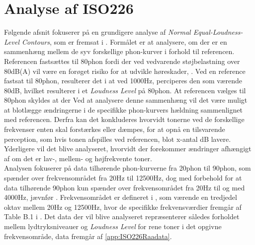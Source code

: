 \chapter{Analyse af ISO226}
\label{AnalyseAfISO226}
%
Følgende afsnit fokuserer på en grundigere analyse af \textit{Normal Equal-Loudness-Level Contours}, som er fremsat i \textcite{STD:ISO226}. Formålet er at analysere, om der er en sammenhæng mellem de syv forskellige phon-kurver i forhold til referencen. Referencen fastsættes til 80phon fordi der ved vedvarende støjbelastning over 80dB(A) vil være en forøget risiko for at udvikle høreskader, \parencite[s. 4]{PDF:ATVejledning}. Ved en reference fastsat til 80phon, resulterer det i at ved 1000Hz, perciperes den som værende 80dB, hvilket resulterer i et \textit{Loudness Level} på 80phon. At referencen vælges til 80phon skyldes at der  Ved at analysere denne sammenhæng vil det være muligt at blotlægge ændringerne i de specifikke phon-kurvers hældning sammenlignet med referencen. Derfra kan det konkluderes hvorvidt tonerne ved de forskellige frekvenser enten skal forstærkes eller dæmpes, for at opnå en tilsvarende perception, som hvis tonen afspilles ved referencen, blot x-antal dB lavere. Yderligere vil det blive analyseret, hvorvidt der forekommer ændringer afhængigt af om det er lav-, mellem- og højfrekvente toner. \\[5mm]
%
Analysen fokuserer på data tilhørende phon-kurverne fra 20phon til 90phon, som spænder over frekvensområdet fra 20Hz til 12500Hz, dog med forbehold for at data tilhørende 90phon kun spænder over frekvensområdet fra 20Hz til og med 4000Hz, jævnfør . Frekvensområdet er defineret i \textcite[s. 1]{STD:ISO226}, som værende en tredjedel oktav mellem 20Hz og 12500Hz, hvor de specifikke frekvensværdier fremgår af Table B.1 i \textcite[ss. 6-7]{STD:ISO226}. Det data der vil blive analyseret repræsenterer således forholdet mellem lydtryksniveauer og \textit{Loudness Level} for rene toner i det opgivne frekvensområde, data fremgår af \autoref{app:ISO226Raadata}.


